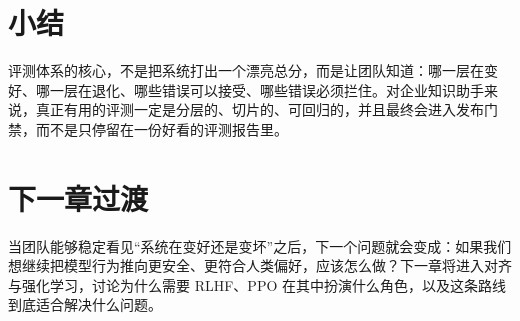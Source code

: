 \section{小结}
评测体系的核心，不是把系统打出一个漂亮总分，而是让团队知道：哪一层在变好、哪一层在退化、哪些错误可以接受、哪些错误必须拦住。对企业知识助手来说，真正有用的评测一定是分层的、切片的、可回归的，并且最终会进入发布门禁，而不是只停留在一份好看的评测报告里。

\section{下一章过渡}
当团队能够稳定看见“系统在变好还是变坏”之后，下一个问题就会变成：如果我们想继续把模型行为推向更安全、更符合人类偏好，应该怎么做？下一章将进入对齐与强化学习，讨论为什么需要 RLHF、PPO 在其中扮演什么角色，以及这条路线到底适合解决什么问题。
